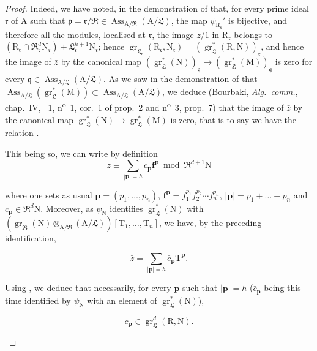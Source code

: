 \begin{proof}
Indeed, we have noted, in the demonstration of  that, for every prime ideal $\mathfrak{r}$ of $\mathrm{A}$ such that $\mathfrak{p}=\mathfrak{r}/\mathfrak{R}\in\operatorname{Ass}_{\mathrm{A}/\mathfrak{R}}(\mathrm{A}/\mathfrak{L})$, the map $\psi_{\mathrm{R}_\mathfrak{r}}'$ is bijective, and therefore all the modules, localised at $\mathfrak{r}$, the image $z/1$ in $\mathrm{R}_\mathfrak{r}$ belongs to $(\mathrm{R}_\mathfrak{r}\cap\mathfrak{R}_\mathfrak{r}^d\mathrm{N}_\mathfrak{r})+\mathfrak{L}_\mathfrak{r}^{h+1}\mathrm{N}_\mathfrak{r}$; hence $\operatorname{gr}_{\mathfrak{L}_\mathfrak{r}}(\mathrm{R}_\mathfrak{r},\mathrm{N}_\mathfrak{r})=(\operatorname{gr}_\mathfrak{L}^*(\mathrm{R},\mathrm{N}))_\mathfrak{r}$, and hence the image of $\bar{z}$ by the canonical map $(\operatorname{gr}_\mathfrak{L}^*(\mathrm{N}))_\mathfrak{q}\to(\operatorname{gr}_\mathfrak{L}^*(\mathrm{M}))_\mathfrak{q}$ is zero for every $\mathfrak{q}\in\operatorname{Ass}_{\mathrm{A}/\mathfrak{L}}(\mathrm{A}/\mathfrak{L})$. As we saw in the demonstration of  that $\operatorname{Ass}_{\mathrm{A}/\mathfrak{L}}(\operatorname{gr}_\mathfrak{L}^*(\mathrm{M}))\subset\operatorname{Ass}_{\mathrm{A}/\mathfrak{L}}(\mathrm{A}/\mathfrak{L})$, we deduce (Bourbaki, \emph{Alg.~comm.}, chap.~IV, \textsection~1, n\textsuperscript{o}~1, cor.~1 of prop.~2 and n\textsuperscript{o}~3, prop.~7) that the image of $\bar{z}$ by the canonical map $\operatorname{gr}_\mathfrak{L}^*(\mathrm{N})\to\operatorname{gr}_\mathfrak{L}^*(\mathrm{M})$ is zero, that is to say we have the relation .

\begin{env}[19.7.1.21]
\label{IV.19.7.1.21}
This being so, we can write by definition
\[
  z\equiv\textstyle\sum_{|\mathbf{p}|=h}c_\mathbf{p}\mathbf{f}^\mathbf{p}\bmod{\mathfrak{R}^{d+1}\mathrm{N}}
\]
\end{env}
where one sets as usual $\mathbf{p}=(p_1,\ldots,p_n)$, $\mathbf{f}^\mathbf{p}=f_1^{p_1}f_2^{p_2}\cdots f_n^{p_n}$, $|\mathbf{p}|=p_1+\ldots+p_n$ and $c_\mathbf{p}\in\mathfrak{R}^d\mathrm{N}$. Moreover, as $\psi_\mathrm{N}$ identifies $\operatorname{gr}_\mathfrak{L}^*(\mathrm{N})$ with $(\operatorname{gr}_\mathfrak{R}(\mathrm{N})\otimes_{\mathrm{A}/\mathfrak{R}}(\mathrm{A}/\mathfrak{L}))[\mathrm{T}_1,\ldots,\mathrm{T}_n]$, we have, by the preceding identification,
\begin{env}[19.7.1.22]
\label{IV.19.7.1.22}
\[
  \bar{z}=\textstyle\sum_{|\mathbf{p}|=h}\bar{c}_\mathbf{p}\mathrm{T}^\mathbf{p}.
\]
\end{env}
Using , we deduce that necessarily, for every $\mathbf{p}$ such that $|\mathbf{p}|=h$ ($\bar{c}_\mathbf{p}$ being this time identified by $\psi_\mathrm{N}$ with an element of $\operatorname{gr}_\mathfrak{L}^*(\mathrm{N})$),
\begin{env}[19.7.1.23]
\label{IV.19.7.1.23}
\[
  \bar{c}_\mathbf{p}\in\operatorname{gr}_\mathfrak{L}^d(\mathrm{R},\mathrm{N}).
\]
\end{env}


\end{proof}
